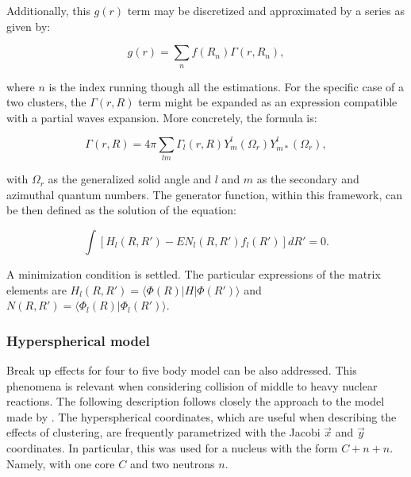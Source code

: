 \documentclass[openany]{book}
\begin{document}
Additionally, this $g(r)$ term may be discretized and approximated by a series as given by: 

\begin{equation}\label{eq:micro_cluster_equivalency_GCM_g_series}
	g(r) = \sum_n f(R_n) \Gamma(r, R_n),
\end{equation}

where $n$ is the index running though all the estimations. For the specific case of a two clusters, the $\Gamma(r, R)$ term might be expanded as an expression compatible with a partial waves expansion. More concretely, the formula is:

\begin{equation}\label{eq:micro_cluster_gamma}
	\Gamma(r, R) = 4\pi \sum_{lm} {\Gamma_l(r, R) Y^{l}_m(\Omega_r) Y^{l}_{m*}(\Omega_r)},
\end{equation}

with $\Omega_r$ as the generalized solid angle and $l$ and $m$ as the secondary and azimuthal quantum numbers. The generator function, within this framework, can be then defined as the solution of the equation: 

\begin{equation}\label{eq:micro_cluster_g_equation}
	\int [H_l(R, R') - E N_l(R, R') f_l(R')] dR' = 0.
\end{equation}

A minimization condition is settled. The particular expressions of the matrix elements are $ H_l(R, R') = \langle  \Phi(R) | H | \Phi(R') \rangle $ and $ N(R, R') = \langle  \Phi_l(R) | \Phi_l(R') \rangle $. \\


\subsubsection{Hyperspherical model}\label{ssub:micro_cluster_hyperspherical}

Break up effects for four to five body model can be also addressed. This phenomena is relevant when considering collision of middle to heavy nuclear reactions. The following description follows closely the approach to the model made by  \cite{shubhchintak_descouvemont_2022}. The hyperspherical coordinates, which are useful when describing the effects of clustering, are frequently parametrized with the Jacobi $\vec x$ and $\vec y$ coordinates. In particular, this was used for a nucleus with the form $C + n + n$. Namely, with one core $C$ and two neutrons $n$. \\
\end{document}
